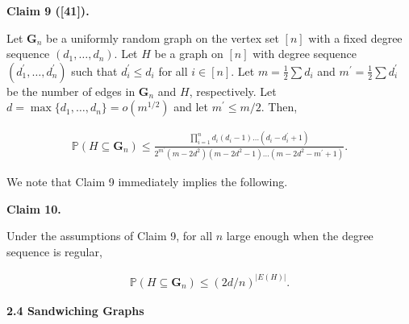 \documentclass[10pt,a4paper]{article}
\begin{document}


\par\medskip\noindent\textbf{
Claim 9 ([41]). 
}\par



Let $\mathbf{G}_{n}$ be a uniformly random graph on the vertex set $[n]$ with a fixed degree sequence $(d_{1},\ldots,d_{n})$. Let $H$ be a graph on $[n]$ with degree sequence $(d^{\prime}_{1},\ldots,d^{\prime}_{n})$ such that $d^{\prime}_{i}\leq d_{i}$ for all $i\in[n]$. Let $m=\frac{1}{2}\sum d_{i}$ and $m^{\prime}=\frac{1}{2}\sum d^{\prime}_{i}$ be the number of edges in $\mathbf{G}_{n}$ and $H$, respectively. Let $d=\max\{d_{1},\ldots,d_{n}\}=o(m^{1/2})$ and let $m^{\prime}\leq m/2$. Then,\par


\[\begin{gathered}
\mathbb{P}(H\subseteq\mathbf{G}_{n})\leq\frac{\prod_{i=1}^{n}d_{i}(d_{i}-1)\ldots(d_{i}-d^{\prime}_{i}+1)}{2^{m^{\prime}}(m-2d^{2})(m-2d^{2}-1)\ldots(m-2d^{2}-m^{\prime}+1)}.
\end{gathered}\]






We note that Claim 9 immediately implies the following.\par





\par\medskip\noindent\textbf{
Claim 10. 
}\par



Under the assumptions of Claim 9, for all $n$ large enough when the degree sequence is regular,\par


\[\begin{gathered}
\mathbb{P}(H\subseteq\mathbf{G}_{n})\leq\left(2d/n\right)^{|E(H)|}.
\end{gathered}\]







\par\medskip\noindent\textbf{
2.4 Sandwiching Graphs}\par
\end{document}
